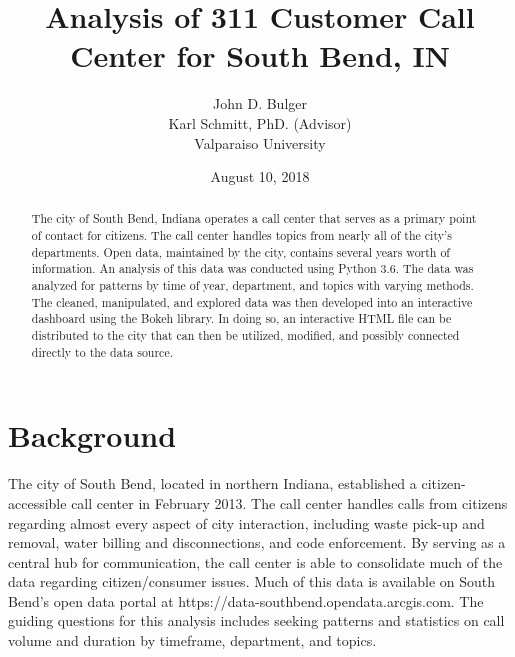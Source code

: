 \documentclass[11pt,twocolumn]{article}
\title{Analysis of 311 Customer Call Center for South Bend, IN}
\author{John D. Bulger
\\
Karl Schmitt, PhD. (Advisor)
\\
Valparaiso University\\
}
\date{August 10, 2018}
\begin{document}
\maketitle

\begin{abstract}
The city of South Bend, Indiana operates a call center that serves as a primary point of contact for citizens.  The call center handles topics from nearly all of the city's departments.  Open data, maintained by the city, contains several years worth of information.  An analysis of this data was conducted using Python 3.6.  The data was 
analyzed for patterns by time of year, department, and topics with varying methods.  The cleaned, manipulated, and explored data was then developed into an 
interactive dashboard using the Bokeh library.  In doing so, an interactive HTML file can be distributed to the city that can then be utilized, modified, and possibly connected 
directly to the data source.
\end{abstract}

\section{Background}
The city of South Bend, located in northern Indiana, established a citizen-accessible call center in February 2013.  The call center handles calls from citizens regarding almost every aspect of city interaction, including waste pick-up and removal, water billing and disconnections, 
and code enforcement.  By serving as a central hub for communication, the call center is able to consolidate much of the data regarding citizen/consumer issues.  
Much of this data is available on South Bend's open data portal at https://data-southbend.opendata.arcgis.com.  The guiding questions for this analysis includes seeking patterns and statistics on call volume and duration by timeframe, department, and topics.
\end{document}
